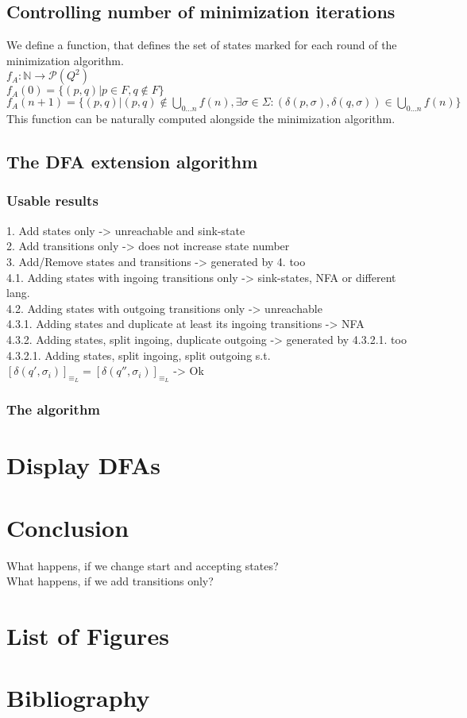 \documentclass[a4paper, oneside, 11pt]{report}
\theoremstyle{definition}
\theoremstyle{remark}
\begin{document}
\section{Controlling number of minimization iterations}

We define a function, that defines the set of states marked for each round of the minimization algorithm. \\
$f_A \colon \mathbb{N} \to \mathcal{P}(Q^2)$ \\
$f_A(0) = \{ (p,q) | p \in F, q \notin F \}$ \\
$f_A(n+1) = \{ (p,q) | (p,q) \notin \bigcup\limits_{0 \dots n}f(n), \exists \sigma \in \Sigma \colon (\delta(p,\sigma), \delta(q,\sigma)) \in \bigcup\limits_{0 \dots n}f(n)\}$ \\
This function can be naturally computed alongside the minimization algorithm.


\section{The DFA extension algorithm}

\subsection{Usable results}

1. Add states only -> unreachable and sink-state \\
2. Add transitions only -> does not increase state number \\
3. Add/Remove states and transitions -> generated by 4. too \\
4.1. Adding states with ingoing transitions only -> sink-states, NFA or different lang. \\
4.2. Adding states with outgoing transitions only -> unreachable \\
4.3.1. Adding states and duplicate at least its ingoing transitions -> NFA \\
4.3.2. Adding states, split ingoing, duplicate outgoing -> generated by 4.3.2.1. too \\
4.3.2.1. Adding states, split ingoing, split outgoing s.t. $[\delta(q', \sigma_i)]_{\equiv_L} = [\delta(q'', \sigma_i)]_{\equiv_L}$ -> Ok


\subsection{The algorithm}




\chapter{Display DFAs}




\chapter{Conclusion}

What happens, if we change start and accepting states? \\
What happens, if we add transitions only?


\appendix
\chapter{List of Figures}
\chapter{Bibliography}
\end{document}
